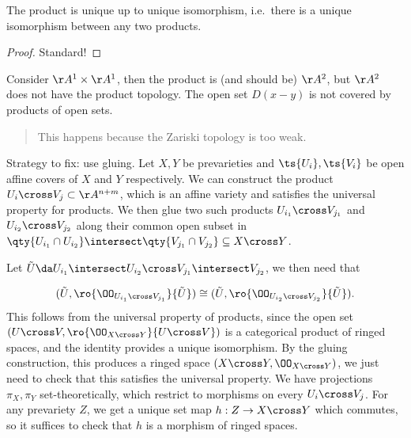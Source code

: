 \begin{proposition}[?]

The product is unique up to unique isomorphism, i.e.~there is a unique
isomorphism between any two products.

\end{proposition}

\begin{proof}

Standard!

\end{proof}

\begin{example}

Consider \(\AA^1 \times \AA^1\), then the product is (and should be)
\(\AA^2\), but \(\AA^2\) does not have the product topology. The open
set \(D(x-y)\) is not covered by products of open sets.

\begin{quote}
This happens because the Zariski topology is too weak.
\end{quote}

\end{example}

Strategy to fix: use gluing. Let \(X, Y\) be prevarieties and
\(\ts{U_i}, \ts{V_i}\) be open affine covers of \(X\) and \(Y\)
respectively. We can construct the product
\(U_i \cross V_j \subset \AA^{n+m}\), which is an affine variety and
satisfies the universal property for products. We then glue two such
products \(U_{i_1} \cross V_{j_1}\) and \(U_{i_2} \cross V_{j_2}\) along
their common open subset in
\(\qty{U_{i_1}\cap U_{i_2} }\intersect\qty{V_{j_1} \cap V_{j_2}} \subseteq X\cross Y\).

Let
\(\tilde U \da U_{i_1} \intersect U_{i_2} \cross V_{j_1} \intersect V_{j_2}\),
we then need that

\begin{align*}  
(\tilde U, \ro{ \OO_{U_{i_1} \cross V_{j_1}} }{\tilde U} ) \cong
(\tilde U, \ro{ \OO_{U_{i_2} \cross V_{j_2}} }{\tilde U} )
.\end{align*} This follows from the universal property of products,
since the open set \((U\cross V, \ro{ \OO_{X\cross Y} }{U\cross V} )\)
is a categorical product of ringed spaces, and the identity provides a
unique isomorphism. By the gluing construction, this produces a ringed
space \((X\cross Y, \OO_{X\cross Y})\), we just need to check that this
satisfies the universal property. We have projections \(\pi_X, \pi_Y\)
set-theoretically, which restrict to morphisms on every
\(U_i \cross V_j\). For any prevariety \(Z\), we get a unique set map
\(h:Z\to X\cross Y\) which commutes, so it suffices to check that \(h\)
is a morphism of ringed spaces.

